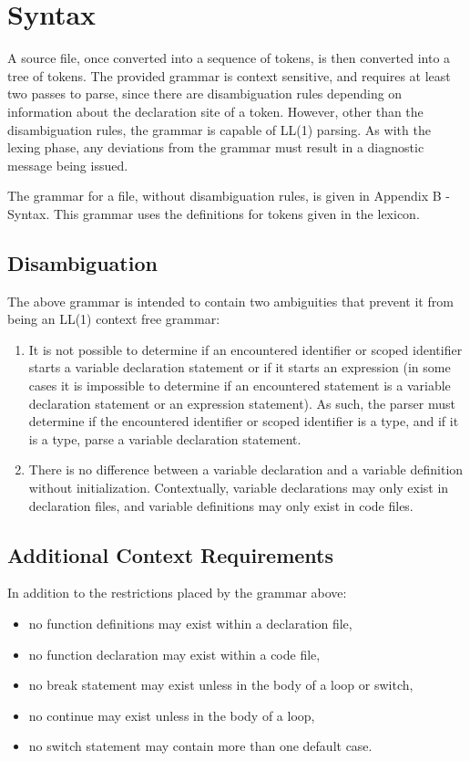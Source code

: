 \documentclass[letterpaper,12pt]{book}
\begin{document}
\chapter{Syntax}

A source file, once converted into a sequence of tokens, is then converted into a tree of tokens. The provided grammar is context sensitive, and requires at least two passes to parse, since there are disambiguation rules depending on information about the declaration site of a token. However, other than the disambiguation rules, the grammar is capable of LL(1) parsing. As with the lexing phase, any deviations from the grammar must result in a diagnostic message being issued.

The grammar for a file, without disambiguation rules, is given in Appendix B - Syntax. This grammar uses the definitions for tokens given in the lexicon.

\section{Disambiguation}

The above grammar is intended to contain two ambiguities that prevent it from being an LL(1) context free grammar:

\begin{enumerate}

	\item It is not possible to determine if an encountered identifier or scoped identifier starts a variable declaration statement or if it starts an expression (in some cases it is impossible to determine if an encountered statement is a variable declaration statement or an expression statement). As such, the parser must determine if the encountered identifier or scoped identifier is a type, and if it is a type, parse a variable declaration statement.
	
	\item There is no difference between a variable declaration and a variable definition without initialization. Contextually, variable declarations may only exist in declaration files, and variable definitions may only exist in code files.
\end{enumerate}

\section{Additional Context Requirements}

In addition to the restrictions placed by the grammar above:
\begin{itemize}
	\item no function definitions may exist within a declaration file,
	\item no function declaration may exist within a code file,
	\item no break statement may exist unless in the body of a loop or switch,
	\item no continue may exist unless in the body of a loop,
	\item no switch statement may contain more than one default case.
\end{itemize}
\end{document}
